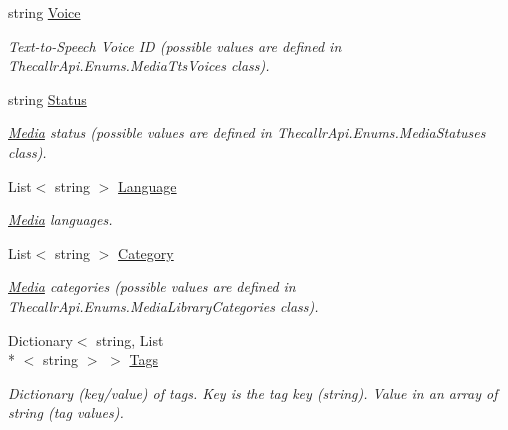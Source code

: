 \begin{DoxyCompactItemize}
string \hyperlink{class_thecallr_api_1_1_objects_1_1_media_1_1_media_library_a93fdc07d8cad82b6a52025e15783106c}{Voice}
\begin{DoxyCompactList}\small\item\em Text-\/to-\/\+Speech Voice I\+D (possible values are defined in Thecallr\+Api.\+Enums.\+Media\+Tts\+Voices class). \end{DoxyCompactList}\item 
string \hyperlink{class_thecallr_api_1_1_objects_1_1_media_1_1_media_library_a241facca8ba1a21a3c3b6cf0ad116334}{Status}
\begin{DoxyCompactList}\small\item\em \hyperlink{namespace_thecallr_api_1_1_objects_1_1_media}{Media} status (possible values are defined in Thecallr\+Api.\+Enums.\+Media\+Statuses class). \end{DoxyCompactList}\item 
List$<$ string $>$ \hyperlink{class_thecallr_api_1_1_objects_1_1_media_1_1_media_library_aab1314d4f77d95a5257c3e7c1096d908}{Language}
\begin{DoxyCompactList}\small\item\em \hyperlink{namespace_thecallr_api_1_1_objects_1_1_media}{Media} languages. \end{DoxyCompactList}\item 
List$<$ string $>$ \hyperlink{class_thecallr_api_1_1_objects_1_1_media_1_1_media_library_a3f76165fd490356b94ce34cbb43cdbc3}{Category}
\begin{DoxyCompactList}\small\item\em \hyperlink{namespace_thecallr_api_1_1_objects_1_1_media}{Media} categories (possible values are defined in Thecallr\+Api.\+Enums.\+Media\+Library\+Categories class). \end{DoxyCompactList}\item 
Dictionary$<$ string, List\\*
$<$ string $>$ $>$ \hyperlink{class_thecallr_api_1_1_objects_1_1_media_1_1_media_library_a762c427c7906705923eb7d5ee5b6feb5}{Tags}
\begin{DoxyCompactList}\small\item\em Dictionary (key/value) of tags. Key is the tag key (string). Value in an array of string (tag values). \end{DoxyCompactList}\item 

\end{DoxyCompactItemize}
